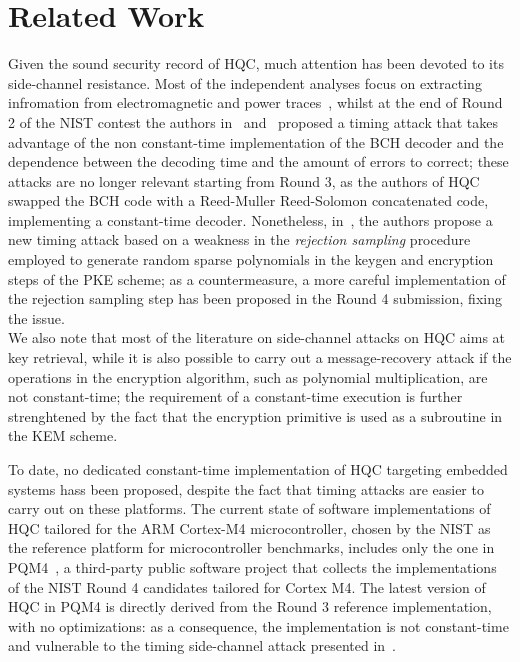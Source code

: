 \section{Related Work}
Given the sound security record of HQC, much attention has been devoted to its side-channel resistance. Most of the 
independent analyses focus on extracting infromation from electromagnetic and power traces~\cite{DBLP:conf/cardis/SchambergerRSW20, DBLP:conf/pqcrypto/SchambergerHRWS22, DBLP:conf/pqcrypto/GoyLG22},
whilst at the end of Round 2 of the NIST contest the authors in~\cite{DBLP:journals/amco/Wafo-TapaBBGM22} and~\cite{DBLP:conf/sacrypt/PaivaT19}
proposed a timing attack that takes advantage of the non constant-time implementation of the BCH decoder and the dependence
between the decoding time and the amount of errors to correct; these attacks are no longer relevant starting from Round 3, 
as the authors of HQC swapped the BCH code with a Reed-Muller Reed-Solomon concatenated code, implementing a constant-time decoder. Nonetheless,
in~\cite{DBLP:journals/tches/GuoHJLNS22}, the authors propose a new timing attack based on a weakness in the \emph{rejection sampling} procedure
employed to generate random sparse polynomials in the keygen and encryption steps of the PKE scheme; as a countermeasure, a more careful implementation of the rejection sampling
step has been proposed in the Round 4 submission, fixing the issue.\\
We also note that most of the literature on side-channel attacks on HQC aims at key retrieval, while it is
also possible to carry out a message-recovery attack if the operations in the encryption algorithm, such as polynomial
multiplication, are not constant-time; the requirement of a constant-time execution is further strenghtened by the fact 
that the encryption primitive is used as a subroutine in the KEM scheme.

To date, no dedicated constant-time implementation of HQC targeting embedded systems hass been proposed, despite the 
fact that timing attacks are easier to carry out on these platforms. The current state of software implementations of HQC
tailored for the ARM Cortex-M4 microcontroller, chosen by the NIST as the reference platform for microcontroller benchmarks,
includes only the one in PQM4~\cite{PQM4}, a third-party public software project that collects the implementations of the NIST
Round 4 candidates tailored for Cortex M4. The latest version of HQC in PQM4 is directly derived from the Round 3 reference 
implementation, with no optimizations: as a consequence, the implementation is not constant-time and vulnerable to the timing
side-channel attack presented in~\cite{DBLP:journals/tches/GuoHJLNS22}.